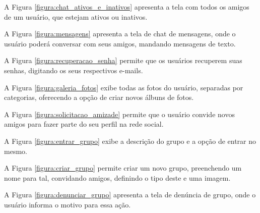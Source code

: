 
A Figura \ref{figura:chat_ativos_e_inativos} apresenta a tela com todos os amigos de um usuário, que estejam ativos ou inativos.


A Figura \ref{figura:mensagens} apresenta a tela de chat de mensagens, onde o usuário poderá conversar com seus amigos, mandando mensagens de texto.


A Figura \ref{figura:recuperacao_senha} permite que os usuários recuperem suas senhas, digitando os seus respectivos e-mails.


A Figura \ref{figura:galeria_fotos} exibe todas as fotos do usuário, separadas por categorias, oferecendo a opção de criar novos álbuns de fotos.


A Figura \ref{figura:solicitacao_amizade} permite que o usuário convide novos amigos para fazer parte do seu perfil na rede social.


A Figura \ref{figura:entrar_grupo} exibe a descrição do grupo e a opção de entrar no mesmo.


A Figura \ref{figura:criar_grupo} permite criar um novo grupo, preenchendo um nome para tal, convidando amigos, definindo o tipo deste e uma imagem.


A Figura \ref{figura:denunciar_grupo} apresenta a tela de denúncia de grupo, onde o usuário informa o motivo para essa ação.


